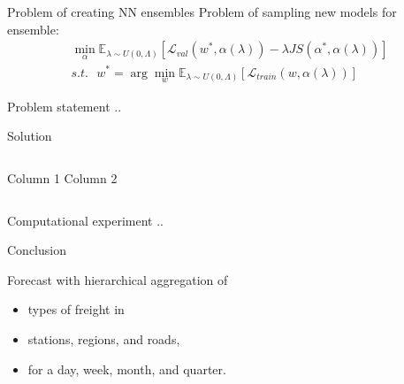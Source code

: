 \documentclass{beamer}
\begin{document}
\begin{frame}{Problem of creating NN ensembles}
    \bigskip
    Problem of sampling new models for ensemble: 
    \begin{gather*}
        \min_{\alpha} \mathbb{E}_{\lambda \sim U(0, \Lambda)} [\mathcal{L}_{val}(w^*, \alpha(\lambda)) - \lambda JS(\alpha^*, \alpha(\lambda))] \\
        s.t. \text{ } w^* = \arg \min_w \mathbb{E}_{\lambda \sim U(0, \Lambda)}[\mathcal{L}_{train}(w, \alpha(\lambda))]
    \end{gather*}

\end{frame}


\begin{frame}{Problem statement}
..
\end{frame}
\begin{frame}{Solution}
\begin{columns}[c]
    Column 1
    Column 2
\end{columns}
\end{frame}
\begin{frame}{Computational experiment}
..
\end{frame}
\begin{frame}{Conclusion}
    \begin{block}{Forecast with hierarchical aggregation of}
    \begin{itemize}
        \item types of freight in
        \item stations, regions, and roads,
        \item for a day, week, month, and quarter.
    \end{itemize}
    \end{block}
\end{frame}
\end{document}

